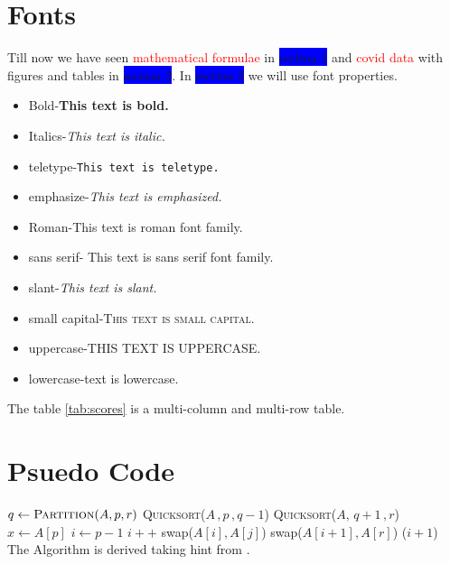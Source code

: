 \documentclass[10pt, a4paper]{article}
\begin{document}
\section{Fonts}
Till now we have seen \textcolor{red}{mathematical formulae} in \colorbox{blue}{section 1} and \textcolor{red}{covid data} with figures and tables in \colorbox{blue}{section 2}. In \colorbox{blue}{section 3} we will use font properties.
\begin{itemize}
	\item Bold-\textbf{This text is bold.}
	\item Italics-\textit{This text is italic.}
	\item teletype-\texttt{This text is teletype.}
	\item emphasize-\emph{This text is emphasized.}
	\item Roman-\textrm{This text is roman font family.}
	\item sans serif- \textsf{This text is sans serif font family.}
	\item slant-\textsl{This text is slant.}
	\item small capital-\textsc{This text is small capital.}
	\item uppercase-THIS TEXT IS UPPERCASE.
	\item lowercase-text is lowercase.
\end{itemize}
\par The table \ref{tab:scores} is a multi-column and multi-row table.
\newpage
\pagecolor{white}
\section{Psuedo Code}
\begin{algorithmic}
		\State $q \gets \textsc{Partition}(A,p,r)$
		\State \textsc{Quicksort}($A \,,p\, ,q-1$)
		\State \textsc{Quicksort}($A,\,q+1\,,r$)
	\EndIf
\EndFunction
{} $x \gets A[p]$ $i \gets p-1$
		\State $i++$
		\State swap($A[i],A[j]$)
		\EndIf
	\EndFor
	\State swap($A[i + 1],A[r]$)
	\State \Return ($i + 1$)
\EndFunction
\newline The Algorithm is derived taking hint from \cite{hoare1962quicksort}.
\end{algorithmic}
\newpage


\end{document}
